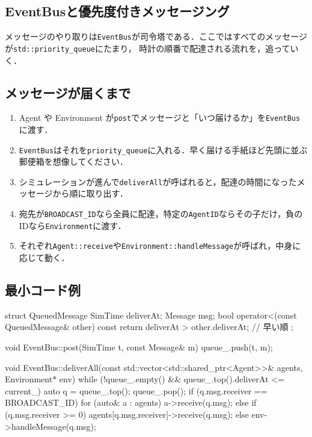 \documentclass[10pt,letterpaper]{jsarticle}
\begin{document}
\subsection{EventBusと優先度付きメッセージング}\label{app:eventbus}
メッセージのやり取りは\texttt{EventBus}が司令塔である．ここではすべてのメッセージが\texttt{std::priority\_queue}にたまり，
時計の順番で配達される流れを，追っていく．

\subsection{メッセージが届くまで}
\begin{enumerate}
  \item Agent や Environment が\texttt{post}でメッセージと「いつ届けるか」を\texttt{EventBus}に渡す．
  \item \texttt{EventBus}はそれを\texttt{priority\_queue}に入れる．早く届ける手紙ほど先頭に並ぶ郵便箱を想像してください．
  \item シミュレーションが進んで\texttt{deliverAll}が呼ばれると，配達の時間になったメッセージから順に取り出す．
  \item 宛先が\texttt{BROADCAST\_ID}なら全員に配達，特定の\texttt{AgentID}ならその子だけ，負のIDなら\texttt{Environment}に渡す．
  \item それぞれ\texttt{Agent::receive}や\texttt{Environment::handleMessage}が呼ばれ，中身に応じて動く．
\end{enumerate}

\subsection{最小コード例}
\begin{cppcode}
struct QueuedMessage {
    SimTime deliverAt;
    Message msg;
    bool operator<(const QueuedMessage& other) const {
        return deliverAt > other.deliverAt; // 早い順
    }
};

void EventBus::post(SimTime t, const Message& m) {
    queue_.push({t, m});
}

void EventBus::deliverAll(const std::vector<std::shared_ptr<Agent>>& agents,
                          Environment* env) {
    while (!queue_.empty() && queue_.top().deliverAt <= current_) {
        auto q = queue_.top();
        queue_.pop();
        if (q.msg.receiver == BROADCAST_ID) {
            for (auto& a : agents) a->receive(q.msg);
        } else if (q.msg.receiver >= 0) {
            agents[q.msg.receiver]->receive(q.msg);
        } else {
            env->handleMessage(q.msg);
        }
    }
}
\end{cppcode}
\end{document}
